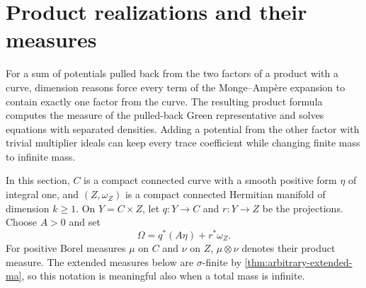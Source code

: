 \section{Product realizations and their measures}
\label{sec:trace-product-measures}

For a sum of potentials pulled back from the two factors of a product with a curve, dimension reasons force every term of the Monge--Amp\`ere expansion to contain exactly one factor from the curve. The resulting product formula computes the measure of the pulled-back Green representative and solves equations with separated densities. Adding a potential from the other factor with trivial multiplier ideals can keep every trace coefficient while changing finite mass to infinite mass.

In this section, $C$ is a compact connected curve with a smooth positive form $\eta$ of integral one, and $(Z,\omega_Z)$ is a compact connected Hermitian manifold of dimension $k\geq1$. On $Y=C\times Z$, let $q:Y\to C$ and $r:Y\to Z$ be the projections. Choose $A>0$ and set
\[
 \Omega=q^*(A\eta)+r^*\omega_Z.
\]
For positive Borel measures $\mu$ on $C$ and $\nu$ on $Z$, $\mu\otimes\nu$ denotes their product measure. The extended measures below are $\sigma$-finite by \cref{thm:arbitrary-extended-ma}, so this notation is meaningful also when a total mass is infinite.

